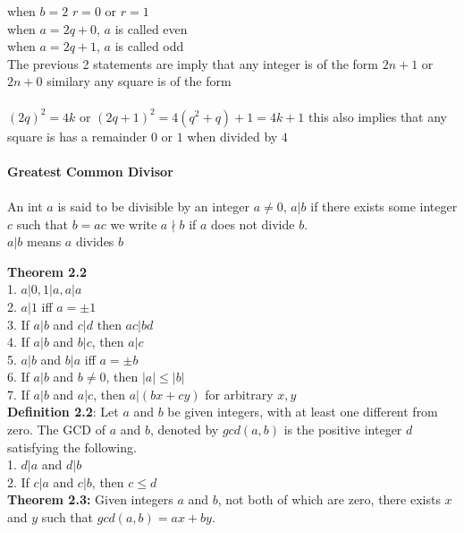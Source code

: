 \documentclass[14pt]{extreport}
\begin{document}
when $b=2$ $r=0$ or $r=1$\\

when $a=2q+0$, $a$ is called even\\

when $a=2q+1$, $a$ is called odd\\

The previous 2 statements are imply that any integer is of the form $2n+1$ or $2n+0$ similary any square is of the form\\\\

${(2q)^2} = 4k$ or $(2q+1)^2 = 4(q^2+q)+1 = 4k+1$ this also implies that any square is has a remainder $0$ or $1$  when divided by $4$\\\\


\textbf{Greatest Common Divisor}\\\\

An int $a$ is said to be divisible by an integer $a \ne 0$, $a|b$ if there exists some integer $c$ such that $b = ac$ we write $a \nmid b$ if $a$ does not divide $b$.\\
$a|b$ means $a$ divides $b$ 

\textbf{Theorem 2.2} \\
1. $a|0, 1|a, a|a$\\
2. $a|1$ iff $a = \pm 1$\\
3. If $a|b$ and $c|d$ then $ac|bd$\\
4. If $a|b$ and $b|c$, then $a|c$\\
5. $a|b$ and $b|a$ iff $a = \pm b$\\
6. If $a|b$ and $b \ne 0$, then $|a| \le |b|$\\
7. If $a|b$ and $a|c$, then $a|(bx+cy)$ for arbitrary $x,y$\\

\textbf{Definition 2.2}: Let $a$ and $b$ be given integers, with at least one different from zero. The GCD of $a$ and $b$, denoted by $gcd(a, b)$ is the positive integer $d$ satisfying the following.\\

1. $d|a$ and $d|b$\\
2. If $c|a$ and $c|b$, then $c \le d$\\

\textbf{Theorem 2.3:} Given integers $a$ and $b$, not both of which are zero, there exists $x$ and $y$ such that $gcd(a, b) = ax + by$.\\
\end{document}
